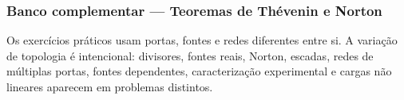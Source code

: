 \subsubsection*{Banco complementar --- Teoremas de Thévenin e Norton}
\begin{atencao}
Os exercícios práticos usam portas, fontes e redes diferentes entre si. A
variação de topologia é intencional: divisores, fontes reais, Norton, escadas,
redes de múltiplas portas, fontes dependentes, caracterização experimental e
cargas não lineares aparecem em problemas distintos.
\end{atencao}




\begingroup
\newcount\fvThNDoisCircuitCount
{}
\let\fvThNDoisCircuitoOriginal\circuitoq
\renewcommand{\circuitoq}[1]{%
  \global\advance\fvThNDoisCircuitCount by 1\relax
  \ifnum\fvThNDoisCircuitCount=8\relax
    \fvThNDoisCircuitoOriginal{\fvThNDoisQOitoRevisada}%
  \else
    \fvThNDoisCircuitoOriginal{#1}%
  \fi}

\endgroup

\begingroup
\newcount\fvThNTresCircuitCount
{}
\let\fvThNTresCircuitoOriginal\circuitoq
\renewcommand{\circuitoq}[1]{%
  \global\advance\fvThNTresCircuitCount by 1\relax
  \ifnum\fvThNTresCircuitCount=9\relax
    \fvThNTresCircuitoOriginal{\fvThNTresQNoveRevisada}%
  \else
    \fvThNTresCircuitoOriginal{#1}%
  \fi}

\endgroup


